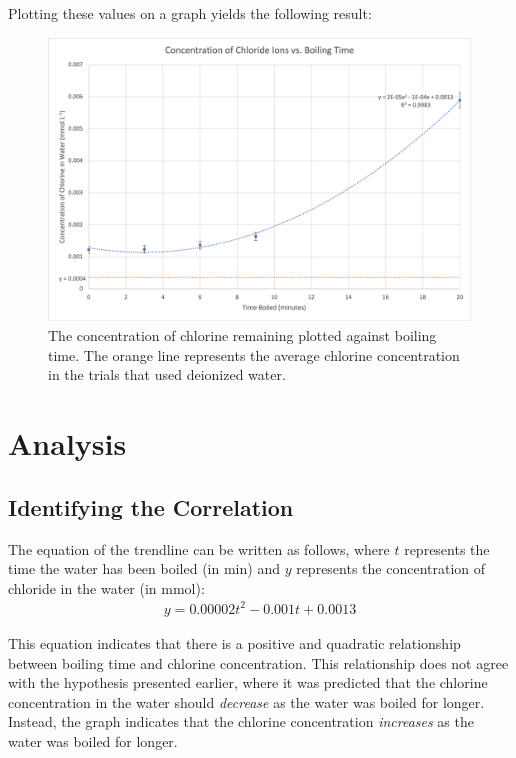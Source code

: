 \documentclass[11pt]{article}
\begin{document}
\newpage

Plotting these values on a graph yields the following result:

\begin{figure}[H]
	\centering
	\caption{The concentration of chlorine remaining plotted against boiling time. The orange line represents the average chlorine concentration in the trials that used deionized water.}
	\includegraphics[width=\linewidth]{assets/concentration-vs-boiling-time.png}
\end{figure}

\section{Analysis}

\subsection{Identifying the Correlation}

The equation of the trendline can be written as follows, where $t$ represents the time the water has been boiled (in \si{\minute}) and $y$ represents the concentration of chloride in the water (in \si{\mmol}):
%
\begin{align*}
	y = 0.00002t^2 - 0.001t + 0.0013
\end{align*}

This equation indicates that there is a positive and quadratic relationship between boiling time and chlorine concentration. This relationship does not agree with the hypothesis presented earlier, where it was predicted that the chlorine concentration in the water should \textit{decrease} as the water was boiled for longer. Instead, the graph indicates that the chlorine concentration \textit{increases} as the water was boiled for longer.
\end{document}
